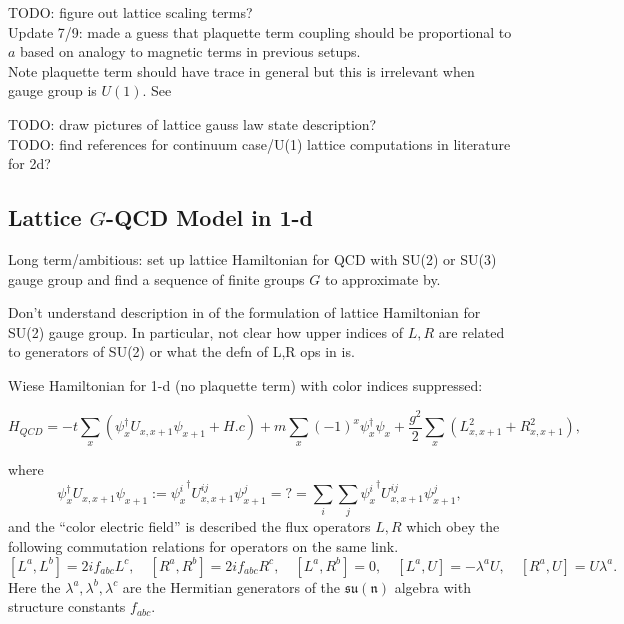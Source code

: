 \documentclass[11pt,reqno]{amsart}
\begin{document}
	TODO: figure out lattice scaling terms? \\
	\qquad Update 7/9: made a guess that plaquette term coupling should be proportional to $a$ based on analogy to magnetic terms in previous setups.\\
	Note plaquette term should have trace in general but this is irrelevant when gauge group is $U(1)$. See \cite{ZoharBurrello15}
	
	
	TODO: draw pictures of lattice gauss law state description?\\
	
	TODO: find references for continuum case/U(1) lattice computations in literature for 2d?
	
	\subsection{Lattice $G$-QCD Model in 1-d}
	
	Long term/ambitious: set up lattice Hamiltonian for QCD with SU(2) or SU(3) gauge group and find a sequence of finite groups $G$ to approximate by.
	
	Don't understand description in \cite{KogutSusskind75,Wiese13} of the formulation of lattice Hamiltonian for SU(2) gauge group.
	In particular, not clear how upper indices of $L,R$ are related to generators of SU(2) or what the defn of L,R ops in \cite{Wiese13} is.
	
	Wiese Hamiltonian for 1-d (no plaquette term) with color indices suppressed:
	
	\begin{equation}
		H_{QCD}=-t\sum_{x} (\psi_x^\dagger U_{x,x+1} \psi_{x+1} + H.c) + m \sum_{x} (-1)^x \psi_x^\dagger\psi_x + \frac{g^2}{2} \sum_{x} (L_{x,x+1}^2+R_{x,x+1}^2),
	\end{equation}
	
	where 
		\[\psi_x^\dagger U_{x,x+1} \psi_{x+1} := {\psi_x^i}^\dagger U_{x,x+1}^{ij} \psi_{x+1}^j =?= \sum_i \sum_j {\psi_x^i}^\dagger U_{x,x+1}^{ij} \psi_{x+1}^j,\]
	and the ``color electric field'' is described the flux operators $L,R$ which obey the following commutation relations for operators on the same link.
		\[ [L^a,L^b]=2if_{abc}L^c, \quad [R^a,R^b]=2if_{abc}R^c, \quad [L^a,R^b]=0, \quad [L^a,U]=-\lambda^a U, \quad [R^a,U]=U\lambda^a. \]
	Here the $\lambda^a,\lambda^b,\lambda^c$ are the Hermitian generators of the $\mathfrak{su(n)}$ algebra with structure constants $f_{abc}$.\\
	
\end{document}
